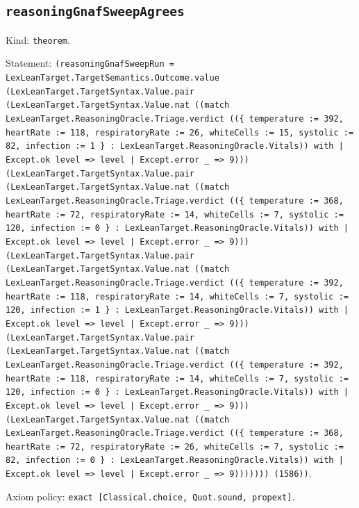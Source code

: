 \documentclass[11pt]{article}
\begin{document}
\subsection*{\texttt{reasoningGnafSweepAgrees}}
\noindent Kind: \texttt{theorem}.\par
\noindent Statement: \texttt{(reasoningGnafSweepRun = LexLeanTarget.TargetSemantics.Outcome.value (LexLeanTarget.TargetSyntax.Value.pair (LexLeanTarget.TargetSyntax.Value.nat ((match LexLeanTarget.ReasoningOracle.Triage.verdict ((\{ temperature := 392, heartRate := 118, respiratoryRate := 26, whiteCells := 15, systolic := 82, infection := 1 \} : LexLeanTarget.ReasoningOracle.Vitals)) with | Except.ok level => level | Except.error \_ => 9))) (LexLeanTarget.TargetSyntax.Value.pair (LexLeanTarget.TargetSyntax.Value.nat ((match LexLeanTarget.ReasoningOracle.Triage.verdict ((\{ temperature := 368, heartRate := 72, respiratoryRate := 14, whiteCells := 7, systolic := 120, infection := 0 \} : LexLeanTarget.ReasoningOracle.Vitals)) with | Except.ok level => level | Except.error \_ => 9))) (LexLeanTarget.TargetSyntax.Value.pair (LexLeanTarget.TargetSyntax.Value.nat ((match LexLeanTarget.ReasoningOracle.Triage.verdict ((\{ temperature := 392, heartRate := 118, respiratoryRate := 14, whiteCells := 7, systolic := 120, infection := 1 \} : LexLeanTarget.ReasoningOracle.Vitals)) with | Except.ok level => level | Except.error \_ => 9))) (LexLeanTarget.TargetSyntax.Value.pair (LexLeanTarget.TargetSyntax.Value.nat ((match LexLeanTarget.ReasoningOracle.Triage.verdict ((\{ temperature := 392, heartRate := 118, respiratoryRate := 14, whiteCells := 7, systolic := 120, infection := 0 \} : LexLeanTarget.ReasoningOracle.Vitals)) with | Except.ok level => level | Except.error \_ => 9))) (LexLeanTarget.TargetSyntax.Value.nat ((match LexLeanTarget.ReasoningOracle.Triage.verdict ((\{ temperature := 368, heartRate := 72, respiratoryRate := 26, whiteCells := 7, systolic := 82, infection := 0 \} : LexLeanTarget.ReasoningOracle.Vitals)) with | Except.ok level => level | Except.error \_ => 9))))))) (1586))}.\par
\noindent Axiom policy: \texttt{exact [Classical.choice, Quot.sound, propext]}.\par
\end{document}
